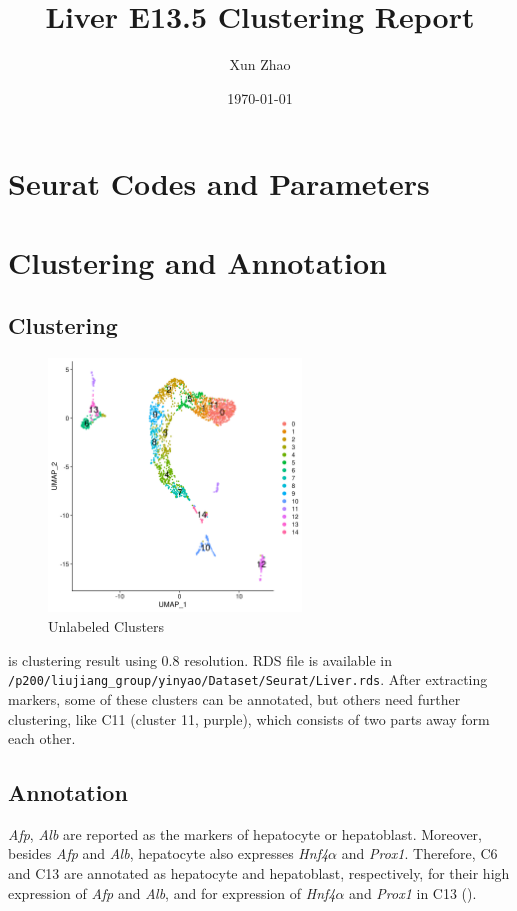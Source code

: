 \documentclass[lang=en]{elegantpaper}
\title{Liver E13.5 Clustering Report}
\author{Xun Zhao}
\date{\today}
\begin{document}
\maketitle

\section{Seurat Codes and Parameters}
\section{Clustering and Annotation}

\subsection{Clustering}

\begin{figure}[htbp]
    \centering
    \includegraphics[width=0.6\textwidth]{image/d.png}
    \caption{Unlabeled Clusters \label{d}}
\end{figure}

 is clustering result using 0.8 resolution. RDS file is available in \lstinline{/p200/liujiang_group/yinyao/Dataset/Seurat/Liver.rds}. After extracting markers, some of these clusters can be annotated, but others need further clustering, like C11 (cluster 11, purple), which consists of two parts away form each other.

\subsection{Annotation}

\emph{Afp}, \emph{Alb} are reported as the markers of hepatocyte or hepatoblast\citep{gordillo_orchestrating_2015, chaudhari_expression_2016, su_single-cell_2017, han_mapping_2018}. Moreover, besides \emph{Afp} and \emph{Alb}, hepatocyte also expresses \emph{Hnf4$\alpha$} and \emph{Prox1}\citep{gordillo_orchestrating_2015}. Therefore, C6 and C13 are annotated as hepatocyte and hepatoblast, respectively, for their high expression of \emph{Afp} and \emph{Alb}, and for expression of \emph{Hnf4$\alpha$} and \emph{Prox1} in C13 ().
\end{document}
